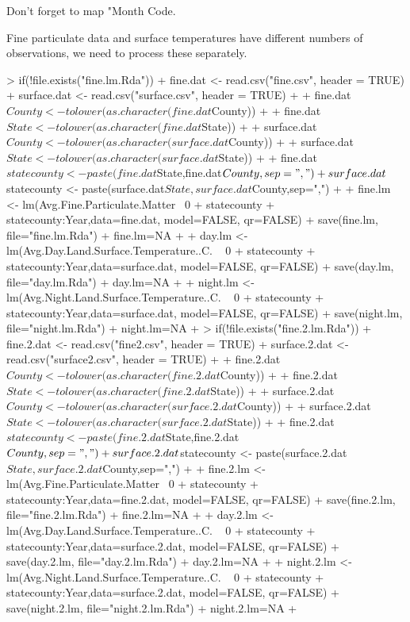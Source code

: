 \documentclass{report}
\begin{document}
Don't forget to map "Month Code.


Fine particulate data and surface temperatures have different numbers of observations, we
need to process these separately.

\begin{Schunk}
\begin{Sinput}
> if(!file.exists("fine.lm.Rda")) {
+    fine.dat <- read.csv("fine.csv", header = TRUE)
+    surface.dat <- read.csv("surface.csv", header = TRUE)
+ 
+    fine.dat$County <- tolower(as.character(fine.dat$County))
+ 
+    fine.dat$State <- tolower(as.character(fine.dat$State))
+ 
+    surface.dat$County <- tolower(as.character(surface.dat$County))
+ 
+    surface.dat$State <- tolower(as.character(surface.dat$State))
+ 
+    fine.dat$statecounty <- paste(fine.dat$State,fine.dat$County,sep=",")
+    surface.dat$statecounty <- paste(surface.dat$State,surface.dat$County,sep=",")
+ 
+    fine.lm <- lm(Avg.Fine.Particulate.Matter~ 0 + statecounty + statecounty:Year,data=fine.dat, model=FALSE, qr=FALSE)
+    save(fine.lm, file="fine.lm.Rda")
+    fine.lm=NA
+    
+    day.lm <- lm(Avg.Day.Land.Surface.Temperature..C. ~ 0 + statecounty + statecounty:Year,data=surface.dat, model=FALSE, qr=FALSE)
+    save(day.lm, file="day.lm.Rda")
+    day.lm=NA
+    
+    night.lm <- lm(Avg.Night.Land.Surface.Temperature..C. ~ 0 + statecounty + statecounty:Year,data=surface.dat, model=FALSE, qr=FALSE)
+    save(night.lm, file="night.lm.Rda")
+    night.lm=NA
+ } 
> if(!file.exists("fine.2.lm.Rda")) {
+    fine.2.dat <- read.csv("fine2.csv", header = TRUE)
+    surface.2.dat <- read.csv("surface2.csv", header = TRUE)
+ 
+    fine.2.dat$County <- tolower(as.character(fine.2.dat$County))
+ 
+    fine.2.dat$State <- tolower(as.character(fine.2.dat$State))
+ 
+    surface.2.dat$County <- tolower(as.character(surface.2.dat$County))
+ 
+    surface.2.dat$State <- tolower(as.character(surface.2.dat$State))
+ 
+    fine.2.dat$statecounty <- paste(fine.2.dat$State,fine.2.dat$County,sep=",")
+    surface.2.dat$statecounty <- paste(surface.2.dat$State,surface.2.dat$County,sep=",")
+ 
+    fine.2.lm <- lm(Avg.Fine.Particulate.Matter~ 0 + statecounty + statecounty:Year,data=fine.2.dat, model=FALSE, qr=FALSE)
+    save(fine.2.lm, file="fine.2.lm.Rda")
+    fine.2.lm=NA
+    
+    day.2.lm <- lm(Avg.Day.Land.Surface.Temperature..C. ~ 0 + statecounty + statecounty:Year,data=surface.2.dat, model=FALSE, qr=FALSE)
+    save(day.2.lm, file="day.2.lm.Rda")
+    day.2.lm=NA
+    
+    night.2.lm <- lm(Avg.Night.Land.Surface.Temperature..C. ~ 0 + statecounty + statecounty:Year,data=surface.2.dat, model=FALSE, qr=FALSE)
+    save(night.2.lm, file="night.2.lm.Rda")
+    night.2.lm=NA
+ }
\end{Sinput}
\end{Schunk}
\end{document}
